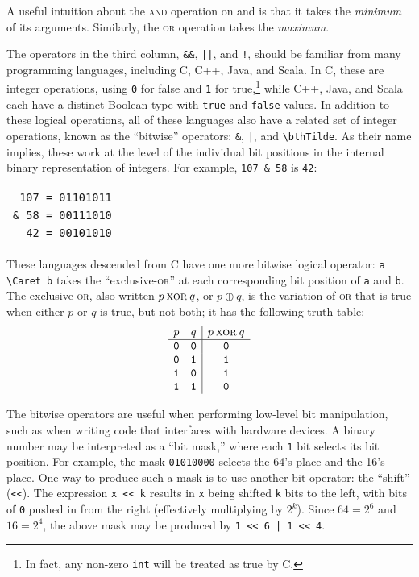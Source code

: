 A useful intuition about the \textsc{and} operation on \0 and \1 is that it takes the \textit{minimum} of its arguments. Similarly, the \textsc{or} operation takes the \textit{maximum}.

The operators in the third column, \verb|&&|, \verb-||-, and \verb|!|, should be familiar from many programming languages, including C, C++, Java, and Scala. In C, these are integer operations, using \verb|0| for false and \verb|1| for true,\footnote{In fact, any non-zero \texttt{int} will be treated as true by C.} while C++, Java, and Scala each have a distinct Boolean type with \verb|true| and \verb|false| values. In addition to these logical operations, all of these languages also have a related set of integer operations, known as the ``bitwise'' operators: \verb|&|, \verb-|-, and \Verb|\bthTilde|. As their name implies, these work at the level of the individual bit positions in the internal binary representation of integers. For example, \verb|107 & 58| is \verb|42|:
\begin{center}\begin{tabular}{c}
\verb| 107 = 01101011| \\
\verb|& 58 = 00111010| \\ \hline
\verb|  42 = 00101010|
\end{tabular}\end{center}

These languages descended from C have one more bitwise logical operator: \Verb|a \Caret b| takes the ``exclusive-\textsc{or}'' at each corresponding bit position of \verb|a| and \verb|b|. The exclusive-\textsc{or}, also written $p\mathbin{\textsc{xor}} q$, or $p\oplus q$, is the variation of \textsc{or} that is true when either $p$ or $q$ is true, but not both; it has the following truth table:
\[
\begin{array}{cc|c}
p & q & p\mathbin{\textsc{xor}} q\\ \hline
\mathtt{0} & \mathtt{0} & \mathtt{0}\\
\mathtt{0} & \mathtt{1} & \mathtt{1}\\
\mathtt{1} & \mathtt{0} & \mathtt{1}\\
\mathtt{1} & \mathtt{1} & \mathtt{0}
\end{array}
\]

The bitwise operators are useful when performing low-level bit manipulation, such as when writing code that interfaces with hardware devices. A binary number may be interpreted as a ``bit mask,'' where each \verb|1| bit selects its bit position. For example, the mask \verb|01010000| selects the 64's place and the 16's place. One way to produce such a mask is to use another bit operator: the ``shift'' (\verb|<<|). The expression \verb|x << k| results in \verb|x| being shifted \verb|k| bits to the left, with bits of \verb|0| pushed in from the right (effectively multiplying by $2^k$). Since $64=2^6$ and $16=2^4$, the above mask may be produced by \verb-1 << 6 | 1 << 4-.

